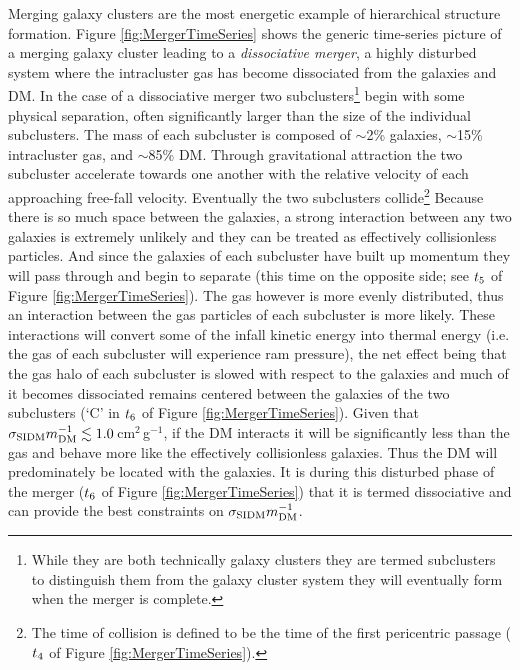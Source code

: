 Merging galaxy clusters are the most energetic example of hierarchical structure formation.
Figure \ref{fig:MergerTimeSeries} shows the generic time-series picture of a merging galaxy cluster leading to a \textit{dissociative merger}, a highly disturbed system where the intracluster gas has become dissociated from the galaxies and DM.
In the case of a dissociative merger two subclusters\footnote{While they are both technically galaxy clusters they are termed subclusters to distinguish them from the galaxy cluster system they will eventually form when the merger is complete.} begin with some physical separation, often significantly larger than the size of the individual subclusters.
The mass of each subcluster is composed of $\sim$2\% galaxies, $\sim$15\% intracluster gas, and $\sim$85\% DM.
Through gravitational attraction the two subcluster accelerate towards one another with the relative velocity of each approaching free-fall velocity.
Eventually the two subclusters collide\footnote{The time of collision is defined to be the time of the first pericentric passage ($t_{\rm 4}$ of Figure \ref{fig:MergerTimeSeries}).}
Because there is so much space between the galaxies, a strong interaction between any two galaxies is extremely unlikely and they can be treated as effectively collisionless particles.
And since the galaxies of each subcluster have built up momentum they will pass through and begin to separate (this time on the opposite side; see $t_{\rm 5}$ of Figure \ref{fig:MergerTimeSeries}).
The gas however is more evenly distributed, thus an interaction between the gas particles of each subcluster is more likely.
These interactions will convert some of the infall kinetic energy into thermal energy (i.e. the gas of each subcluster will experience ram pressure), the net effect being that the gas halo of each subcluster is slowed with respect to the galaxies and much of it becomes dissociated remains centered between the galaxies of the two subclusters (`C' in $t_{\rm 6}$ of Figure \ref{fig:MergerTimeSeries}).
Given that $\sigma_{\rm SIDM}m_{\rm DM}^{-1} \lesssim 1.0$\,cm$^2$\,g$^{-1}$, if the DM interacts it will be significantly less than the gas and behave more like the effectively collisionless galaxies.
Thus the DM will predominately be located with the galaxies. 
It is during this disturbed phase of the merger ($t_{\rm 6}$ of Figure \ref{fig:MergerTimeSeries}) that it is termed dissociative and can provide the best constraints on  $\sigma_{\rm SIDM}m_{\rm DM}^{-1}$.  

